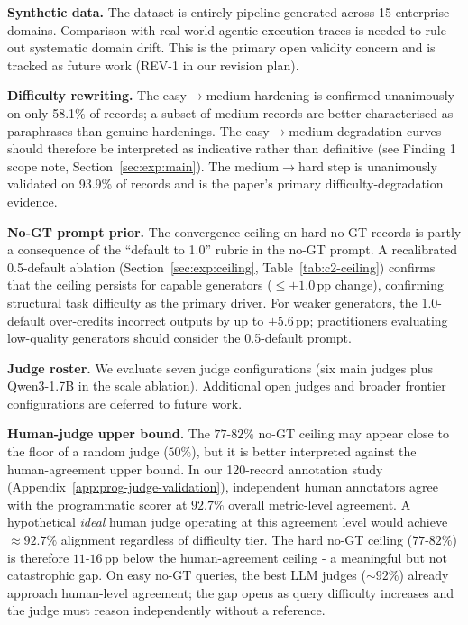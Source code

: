 \textbf{Synthetic data.} The dataset is entirely pipeline-generated across 15 enterprise domains. Comparison with real-world agentic execution traces is needed to rule out systematic domain drift. This is the primary open validity concern and is tracked as future work (REV-1 in our revision plan).

\textbf{Difficulty rewriting.} The easy$\to$medium hardening is confirmed unanimously on only 58.1\% of records; a subset of medium records are better characterised as paraphrases than genuine hardenings. The easy$\to$medium degradation curves should therefore be interpreted as indicative rather than definitive (see Finding 1 scope note, Section~\ref{sec:exp:main}). The medium$\to$hard step is unanimously validated on 93.9\% of records and is the paper's primary difficulty-degradation evidence.

\textbf{No-GT prompt prior.} The convergence ceiling on hard no-GT records is partly a consequence of the ``default to 1.0'' rubric in the no-GT prompt. A recalibrated 0.5-default ablation (Section~\ref{sec:exp:ceiling}, Table~\ref{tab:c2-ceiling}) confirms that the ceiling persists for capable generators (${\leq}{+1.0}$\,pp change), confirming structural task difficulty as the primary driver. For weaker generators, the 1.0-default over-credits incorrect outputs by up to $+5.6$\,pp; practitioners evaluating low-quality generators should consider the 0.5-default prompt.

\textbf{Judge roster.} We evaluate seven judge configurations (six main judges plus Qwen3-1.7B in the scale ablation). Additional open judges and broader frontier configurations are deferred to future work.

\textbf{Human-judge upper bound.} The $77$-$82\%$ no-GT ceiling may appear close to the floor of a random judge ($50\%$), but it is better interpreted against the human-agreement upper bound. In our 120-record annotation study (Appendix~\ref{app:prog-judge-validation}), independent human annotators agree with the programmatic scorer at $92.7\%$ overall metric-level agreement. A hypothetical \emph{ideal} human judge operating at this agreement level would achieve $\approx 92.7\%$ alignment regardless of difficulty tier. The hard no-GT ceiling ($77$-$82\%$) is therefore $11$-$16$\,pp below the human-agreement ceiling - a meaningful but not catastrophic gap. On easy no-GT queries, the best LLM judges ($\sim 92\%$) already approach human-level agreement; the gap opens as query difficulty increases and the judge must reason independently without a reference.

